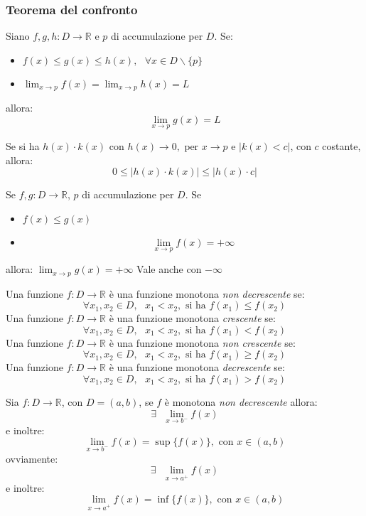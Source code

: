 \documentclass[a4paper,12pt, oneside]{book}
\begin{document}
\subsubsection{Teorema del confronto}
\begin{teorema}
	Siano $f,g,h:D\rightarrow \mathbb{R}$ e $p$ di accumulazione per $D$. Se:
	\begin{itemize}
		\item $f(x)\leq g(x)\leq h(x),\mbox{ } \forall x\in D \backslash \{p\}$
		\item $\lim_{x\rightarrow p} f(x) =\lim_{x\rightarrow p} h(x)=L$
	\end{itemize}
	allora:
	$$\lim_{x\rightarrow p} g(x)=L$$
\end{teorema}
\begin{osservazione}
	Se si ha $h(x)\cdot k(x)$ con $h(x)\rightarrow 0, \mbox{ per } x\rightarrow p$ e $|k(x)<c|$, con $c$ costante, allora:
	$$0\leq |h(x)\cdot k(x)|\leq |h(x)\cdot c|$$
\end{osservazione}
\begin{corollario}
	Se $f,g:D\rightarrow \mathbb{R}$, $p$ di accumulazione per $D$. Se
	\begin{itemize}
		\item $f(x)\leq g(x)$
		\item  $$\lim_{x\rightarrow p} f(x) = +\infty$$
	\end{itemize}
	allora:
	$\lim_{x\rightarrow p} g(x) =+\infty$
	Vale anche con $-\infty$
\end{corollario}
\begin{nota}
	\begin{shaded}
		Una funzione $f:D\rightarrow \mathbb{R}$ è una funzione monotona \textit{non decrescente} se:
		$$\forall x_1,x_2\in D, \mbox{ } x_1<x_2, \mbox{ si ha } f(x_1)\leq f(x_2)$$
		Una funzione $f:D\rightarrow \mathbb{R}$ è una funzione monotona \textit{crescente} se:
		$$\forall x_1,x_2\in D, \mbox{ } x_1<x_2, \mbox{ si ha } f(x_1)< f(x_2)$$
		Una funzione $f:D\rightarrow \mathbb{R}$ è una funzione monotona \textit{non crescente} se:
		$$\forall x_1,x_2\in D, \mbox{ } x_1<x_2, \mbox{ si ha } f(x_1)\geq f(x_2)$$
		Una funzione $f:D\rightarrow \mathbb{R}$ è una funzione monotona \textit{decrescente} se:
		$$\forall x_1,x_2\in D, \mbox{ } x_1<x_2, \mbox{ si ha } f(x_1)> f(x_2)$$
	\end{shaded}
\end{nota}
\begin{teorema}
	Sia $f:D\rightarrow \mathbb{R}$, con $D=(a,b)$, se $f$ è monotona \textit{non decrescente} allora:
	$$\exists \mbox{ } \lim_{x\rightarrow b^{-}} f(x)$$
	e inoltre:
	$$ \lim_{x\rightarrow b^{-}} f(x)=\sup\{f(x)\}, \mbox{ con } x\in (a,b)$$
	ovviamente:
	$$\exists \mbox{ } \lim_{x\rightarrow a^{+}} f(x)$$
	e inoltre:
	$$ \lim_{x\rightarrow a^{+}} f(x)=\inf\{f(x)\}, \mbox{ con } x\in (a,b)$$
\end{teorema}
\end{document}
